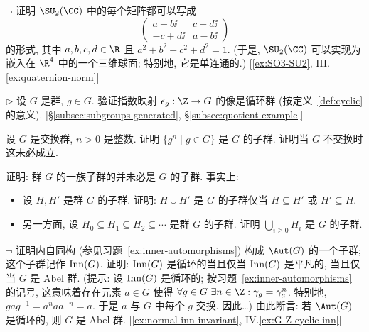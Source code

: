 \begin{prob}
\label{ex:su2-sphere}
$\neg$ 证明 $\SU_2(\CC)$ 中的每个矩阵都可以写成
\[
\begin{pmatrix} a + b\ii & c + d\ii \\ -c + d\ii & a - b\ii \end{pmatrix}
\]
的形式, 其中 $a, b, c, d \in \R$ 且 $a^2 + b^2 + c^2 + d^2 = 1$. (于是, $\SU_2(\CC)$ 可以实现为嵌入在 $\R^4$ 中的一个三维球面; 特别地, 它是单连通的.) [\ref{ex:SO3-SU2}, III.\ref{ex:quaternion-norm}]
\end{prob}

\begin{prob}
\label{ex:cyclic-image}
$\triangleright$ 设 $G$ 是群, $g \in G$. 验证指数映射 $\epsilon_g : \Z \to G$ 的像是循环群 (按定义~\ref{def:cyclic} 的意义). [\S\ref{subsec:subgroups-generated}, \S\ref{subsec:quotient-example}]
\end{prob}

\begin{prob}
\label{ex:powers-subgroup}
设 $G$ 是交换群, $n > 0$ 是整数. 证明 $\{g^n \mid g \in G\}$ 是 $G$ 的子群. 证明当 $G$ 不交换时这未必成立.
\end{prob}

\begin{prob}
\label{ex:union-subgroups}
证明: 群 $G$ 的一族子群的并未必是 $G$ 的子群. 事实上:
\begin{itemize}
	\item 设 $H, H'$ 是群 $G$ 的子群. 证明: $H \cup H'$ 是 $G$ 的子群仅当 $H \subseteq H'$ 或 $H' \subseteq H$.
	\item 另一方面, 设 $H_0 \subseteq H_1 \subseteq H_2 \subseteq \cdots$ 是群 $G$ 的子群. 证明 $\bigcup_{i \geq 0} H_i$ 是 $G$ 的子群.
\end{itemize}
\end{prob}

\begin{prob}
\label{ex:inn-subgroup}
$\neg$ 证明内自同构 (参见习题~\ref{ex:inner-automorphisms}) 构成 $\Aut(G)$ 的一个子群; 这个子群记作 $\operatorname{Inn}(G)$. 证明: $\operatorname{Inn}(G)$ 是循环的当且仅当 $\operatorname{Inn}(G)$ 是平凡的, 当且仅当 $G$ 是 Abel 群. (提示: 设 $\operatorname{Inn}(G)$ 是循环的; 按习题~\ref{ex:inner-automorphisms} 的记号, 这意味着存在元素 $a \in G$ 使得 $\forall g \in G\ \exists n \in \Z: \gamma_g = \gamma_a^n$. 特别地, $gag^{-1} = a^n a a^{-n} = a$. 于是 $a$ 与 $G$ 中每个 $g$ 交换. 因此\ldots) 由此断言: 若 $\Aut(G)$ 是循环的, 则 $G$ 是 Abel 群. [\ref{ex:normal-inn-invariant}, IV.\ref{ex:G-Z-cyclic-inn}]
\end{prob}

